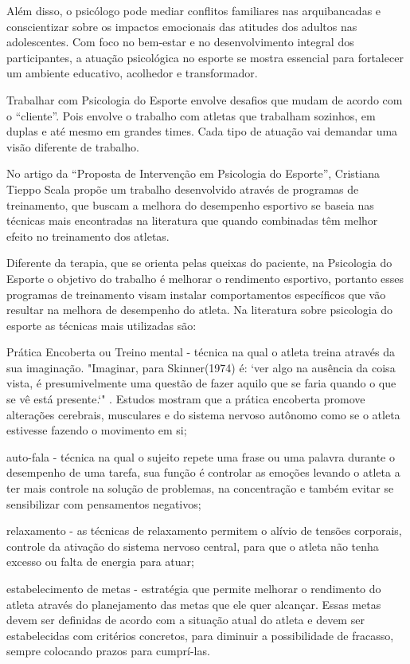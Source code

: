 \begin{Desenvolvimento}
Além disso, o psicólogo pode mediar conflitos familiares nas arquibancadas e conscientizar sobre os impactos emocionais das atitudes dos adultos nas adolescentes. Com foco no bem-estar e no desenvolvimento integral dos participantes, a atuação psicológica no esporte se mostra essencial para fortalecer um ambiente educativo, acolhedor e transformador.

Trabalhar com Psicologia do Esporte envolve desafios que mudam de acordo com o “cliente”.  Pois envolve o trabalho com atletas que trabalham sozinhos, em duplas e até mesmo em grandes times. Cada tipo de atuação vai demandar uma visão diferente de trabalho. 

No artigo da “Proposta de Intervenção em Psicologia do Esporte”, Cristiana Tieppo Scala propõe um trabalho desenvolvido através de programas de treinamento, que buscam a melhora do desempenho esportivo se baseia nas técnicas mais encontradas na literatura que quando combinadas têm melhor efeito no treinamento dos atletas. 

Diferente da terapia, que se orienta pelas queixas do paciente, na Psicologia do Esporte o objetivo do trabalho é melhorar o rendimento esportivo, portanto esses programas de treinamento visam instalar comportamentos específicos que vão resultar na melhora  de desempenho do atleta. Na literatura sobre psicologia do esporte as técnicas mais utilizadas são:

\begin{alinea}
  \item Prática Encoberta ou Treino mental - técnica na qual o atleta treina através da sua imaginação. "Imaginar, para Skinner(1974) é: `ver algo na ausência da coisa vista, é presumivelmente uma questão de fazer aquilo que se faria quando o que se vê está presente.`" . Estudos mostram que a prática encoberta promove alterações cerebrais, musculares e do sistema nervoso autônomo como se o atleta estivesse fazendo o movimento em si;
  \item auto-fala - técnica na qual o sujeito repete uma frase ou uma palavra durante o desempenho de uma tarefa, sua função é controlar as emoções levando o atleta a ter mais controle na solução de problemas, na concentração e também evitar se sensibilizar com pensamentos negativos;
  \item relaxamento - as técnicas de relaxamento permitem o alívio de tensões corporais, controle da ativação do sistema nervoso central, para que o atleta não tenha excesso ou falta de energia para atuar;
  \item estabelecimento de metas -  estratégia que permite melhorar o rendimento do atleta através do planejamento das metas que ele quer alcançar. Essas metas devem ser definidas de acordo com a situação atual do atleta e devem ser estabelecidas com critérios concretos, para diminuir a possibilidade de fracasso, sempre colocando prazos para cumprí-las.
\end{alinea}


\end{Desenvolvimento}
